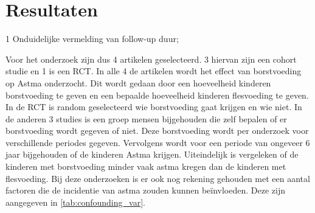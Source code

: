 \documentclass[table,abstract=true]{scrartcl}
\begin{document}
\section{Resultaten}
\begin{table}
   \centering
   \begin{threeparttable}
\begin{tablenotes}
\item[1] Onduidelijke vermelding van follow-up duur;
\end{tablenotes}

\end{threeparttable}
\label{tab:overzicht_artcls}
\end{table}

Voor het onderzoek zijn dus 4 artikelen geselecteerd. 3 hiervan zijn een cohort studie en 1 is een RCT. In alle 4 de artikelen wordt het effect van borstvoeding op Astma onderzocht. Dit wordt gedaan door een hoeveelheid kinderen borstvoeding te geven en een bepaalde hoeveelheid kinderen flesvoeding te geven. In de RCT is random geselecteerd wie borstvoeding gaat krijgen en wie niet. In de anderen 3 studies is een groep mensen bijgehouden die zelf bepalen of er borstvoeding wordt gegeven of niet. Deze borstvoeding wordt per onderzoek voor verschillende periodes gegeven. Vervolgens wordt voor een periode van ongeveer 6 jaar bijgehouden of de kinderen Astma krijgen. Uiteindelijk is vergeleken of de kinderen met borstvoeding minder vaak astma kregen dan de kinderen met flesvoeding. Bij deze onderzoeken is er ook nog rekening gehouden met een aantal factoren die de incidentie van astma zouden kunnen beïnvloeden. Deze zijn aangegeven in \cref{tab:confounding_var}.
\end{document}
